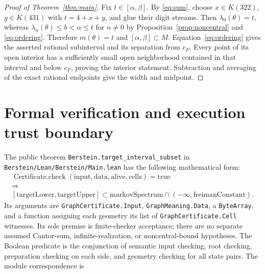\documentclass[11pt,a4paper]{article}
\newcommand{\file}[1]{{\normalfont\small\nolinkurl{#1}}}
\begin{document}
\begin{proof}[Proof of Theorem~\ref{thm:main}]
Fix $t\in[\alpha,\beta]$. By \eqref{eq:sum}, choose $x\in K(322)$,
$y\in K(431)$ with $t=4+x+y$, and glue their digit streams.
Then $\lambda_0(\theta)=t$, whereas
$\lambda_n(\theta)\le b<\alpha\le t$ for $n\ne0$ by
Proposition~\ref{prop:noncentral} and \eqref{eq:ordering}.
Therefore $m(\theta)=t$ and $[\alpha,\beta]\subset M$.
Equation~\eqref{eq:ordering} gives the asserted rational subinterval
and its separation from $c_F$.
Every point of its open interior has a sufficiently small open
neighborhood contained in that interval and below $c_F$, proving the
interior statement. Subtraction and averaging of the exact rational
endpoints give the width and midpoint.
\end{proof}

\section{Formal verification and execution trust boundary}
The public theorem \file{Berstein.target_interval_subset} in
\file{Berstein/Lean/Berstein/Main.lean} has the following mathematical form:
\begin{gather*}
 \operatorname{Certificate.check}(\mathrm{input},\mathrm{data},
 \mathrm{alive},\mathrm{cells})=\mathrm{true}
 \\ \Longrightarrow \\
 [\mathrm{targetLower},\mathrm{targetUpper}]
 \subset \mathrm{markovSpectrum}\cap(-\infty,\mathrm{freimanConstant}).
\end{gather*}
Its arguments are \file{GraphCertificate.Input}, \file{GraphMeaning.Data},
a \file{ByteArray}, and a function assigning each geometry its list of
\file{GraphCertificate.Cell} witnesses. Its sole premise is finite-checker
acceptance; there are no separate assumed Cantor-sum, infinite-realization,
or noncentral-bound hypotheses.
The Boolean predicate is the conjunction of semantic input checking,
root checking, preparation checking on each side, and geometry checking
for all state pairs. The module correspondence is
\end{document}
